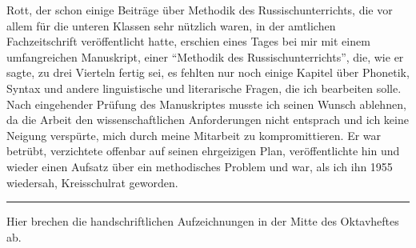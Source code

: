 Rott, der schon einige Beiträge über Methodik des Russischunterrichts, die vor allem für die unteren Klassen sehr nützlich waren, in der amtlichen Fachzeitschrift veröffentlicht hatte, erschien eines Tages bei mir mit einem umfangreichen Manuskript, einer \enquote{Methodik des Russischunterrichts}, die, wie er sagte, zu drei Vierteln fertig sei, es fehlten nur noch einige Kapitel über Phonetik, Syntax und andere linguistische und literarische Fragen, die ich bearbeiten solle. Nach eingehender Prüfung des Manuskriptes musste ich seinen Wunsch ablehnen, da die Arbeit den wissenschaftlichen Anforderungen nicht entsprach und ich keine Neigung verspürte, mich durch meine Mitarbeit zu kompromittieren. Er war betrübt, verzichtete offenbar auf seinen ehrgeizigen Plan, veröffentlichte hin und wieder einen Aufsatz über ein methodisches Problem und war, als ich ihn 1955 wiedersah, Kreisschulrat geworden.\\

\noindent\rule{12cm}{0.4pt}

\begin{addmargin}[25pt]{30pt}
\noindent Hier brechen die handschriftlichen Aufzeichnungen in der Mitte des Oktavheftes ab.
\end{addmargin}
